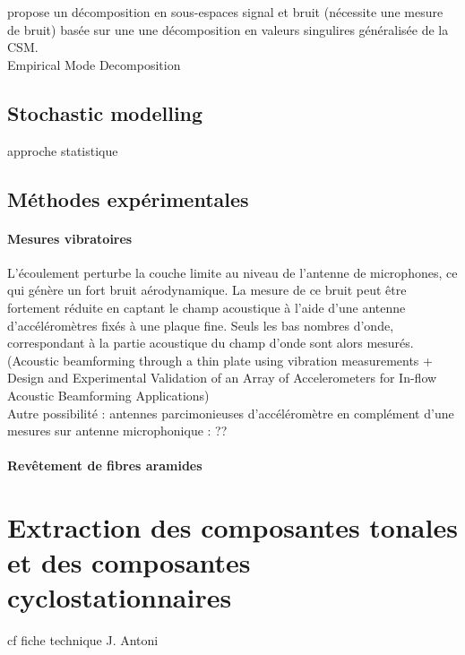 \cite{Bulte2007} propose un décomposition en sous-espaces signal et bruit (nécessite une mesure de bruit) basée sur une une décomposition en valeurs singulires généralisée de la CSM.\\
Empirical Mode Decomposition\\








\subsection{Stochastic modelling}
approche statistique

\subsection{Méthodes expérimentales}

\paragraph{\tbullet Mesures vibratoires} L'écoulement perturbe la couche limite au niveau de l'antenne de microphones, ce qui génère un fort bruit aérodynamique. La mesure de ce bruit peut être fortement réduite en captant le champ acoustique à l'aide d'une antenne d'accéléromètres fixés à une plaque fine. Seuls les bas nombres d'onde, correspondant à la partie acoustique du champ d'onde sont alors mesurés. (Acoustic beamforming through a thin plate using vibration measurements  +   Design and Experimental Validation of an Array of Accelerometers for In-flow Acoustic Beamforming Applications) \\

Autre possibilité : antennes parcimonieuses d'accéléromètre en complément d'une mesures sur antenne microphonique : ??\\

\paragraph{\tbullet Revêtement de fibres aramides}


\section{Extraction des composantes tonales et des composantes cyclostationnaires}
cf fiche technique J. Antoni


